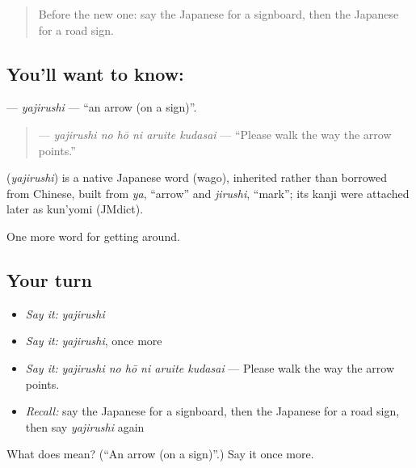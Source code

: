 \begin{quote}
Before the new one: say the Japanese for a signboard, then the Japanese for a road sign.
\end{quote}

\subsection*{You'll want to know: }
\textbf{} — \emph{yajirushi} — \textquotedblleft{}an arrow (on a sign)\textquotedblright{}.

\begin{quote}
\textbf{   } — \emph{yajirushi no hō ni aruite kudasai} — \textquotedblleft{}Please walk the way the arrow points.\textquotedblright{}
\end{quote}

\begin{cousinweb}
\textbf{} (\emph{yajirushi}) is a native Japanese word (wago), inherited rather than borrowed from Chinese, built from \emph{ya}, \textquotedblleft{}arrow\textquotedblright{} and \emph{jirushi}, \textquotedblleft{}mark\textquotedblright{}; its kanji were attached later as kun'yomi (JMdict).
\end{cousinweb}

\begin{grammarlens}[title={What you've built}]
One more word for getting around.
\end{grammarlens}

\subsection*{Your turn}
\begin{itemize}
\raggedright
  \item \emph{Say it:} \emph{yajirushi}
  \item \emph{Say it:} \emph{yajirushi}, once more
  \item \emph{Say it:} \emph{yajirushi no hō ni aruite kudasai} — Please walk the way the arrow points.
  \item \emph{Recall:} say the Japanese for a signboard, then the Japanese for a road sign, then say \emph{yajirushi} again
\end{itemize}

\begin{tcolorbox}[breakable,colback=teal!4,colframe=teal!35!black,title={Before you move on}]
What does  mean? (\textquotedblleft{}An arrow (on a sign)\textquotedblright{}.) Say it once more.
\end{tcolorbox}
